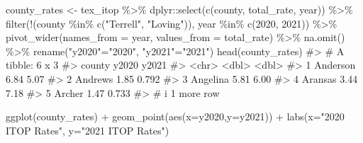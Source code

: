 \documentclass[
  letterpaper,
]{krantz}
\makeatletter
\newenvironment{Shaded}{\begin{snugshade}}{\end{snugshade}}
\newcommand{\AttributeTok}[1]{\textcolor[rgb]{0.40,0.45,0.13}{#1}}
\newcommand{\CommentTok}[1]{\textcolor[rgb]{0.37,0.37,0.37}{#1}}
\newcommand{\DecValTok}[1]{\textcolor[rgb]{0.68,0.00,0.00}{#1}}
\newcommand{\FunctionTok}[1]{\textcolor[rgb]{0.28,0.35,0.67}{#1}}
\newcommand{\NormalTok}[1]{\textcolor[rgb]{0.00,0.23,0.31}{#1}}
\newcommand{\OtherTok}[1]{\textcolor[rgb]{0.00,0.23,0.31}{#1}}
\newcommand{\SpecialCharTok}[1]{\textcolor[rgb]{0.37,0.37,0.37}{#1}}
\newcommand{\StringTok}[1]{\textcolor[rgb]{0.13,0.47,0.30}{#1}}
\newenvironment{kframe}{%
\medskip{}
\setlength{\fboxsep}{.8em}
 \def\at@end@of@kframe{}%
 \ifinner\ifhmode%
  \def\at@end@of@kframe{\end{minipage}}%
  \begin{minipage}{\columnwidth}%
 \fi\fi%
 \def\FrameCommand##1{\hskip\@totalleftmargin \hskip-\fboxsep
 \colorbox{shadecolor}{##1}\hskip-\fboxsep
     \hskip-\linewidth \hskip-\@totalleftmargin \hskip\columnwidth}%
 \MakeFramed {\advance\hsize-\width
   \@totalleftmargin\z@ \linewidth\hsize
   \@setminipage}}%
 {\par\unskip\endMakeFramed%
 \at@end@of@kframe}
\renewenvironment{Shaded}{\begin{kframe}}{\end{kframe}}
\makeatother
\begin{document}
\begin{Shaded}
\begin{Highlighting}[]
\NormalTok{county\_rates }\OtherTok{\textless{}{-}}\NormalTok{ tex\_itop }\SpecialCharTok{\%\textgreater{}\%}
\NormalTok{  dplyr}\SpecialCharTok{::}\FunctionTok{select}\NormalTok{(}\FunctionTok{c}\NormalTok{(county, total\_rate, year)) }\SpecialCharTok{\%\textgreater{}\%}
  \FunctionTok{filter}\NormalTok{(}\SpecialCharTok{!}\NormalTok{(county }\SpecialCharTok{\%in\%} \FunctionTok{c}\NormalTok{(}\StringTok{"Terrell"}\NormalTok{, }\StringTok{"Loving"}\NormalTok{)), }
\NormalTok{         year }\SpecialCharTok{\%in\%} \FunctionTok{c}\NormalTok{(}\DecValTok{2020}\NormalTok{, }\DecValTok{2021}\NormalTok{)) }\SpecialCharTok{\%\textgreater{}\%}
  \FunctionTok{pivot\_wider}\NormalTok{(}\AttributeTok{names\_from =}\NormalTok{ year, }\AttributeTok{values\_from =}\NormalTok{ total\_rate) }\SpecialCharTok{\%\textgreater{}\%}
  \FunctionTok{na.omit}\NormalTok{() }\SpecialCharTok{\%\textgreater{}\%}
  \FunctionTok{rename}\NormalTok{(}\StringTok{"y2020"}\OtherTok{=}\StringTok{"2020"}\NormalTok{, }\StringTok{"y2021"}\OtherTok{=}\StringTok{"2021"}\NormalTok{)}
\FunctionTok{head}\NormalTok{(county\_rates)}
\CommentTok{\#\textgreater{} \# A tibble: 6 x 3}
\CommentTok{\#\textgreater{}   county   y2020 y2021}
\CommentTok{\#\textgreater{}   \textless{}chr\textgreater{}    \textless{}dbl\textgreater{} \textless{}dbl\textgreater{}}
\CommentTok{\#\textgreater{} 1 Anderson  6.84 5.07 }
\CommentTok{\#\textgreater{} 2 Andrews   1.85 0.792}
\CommentTok{\#\textgreater{} 3 Angelina  5.81 6.00 }
\CommentTok{\#\textgreater{} 4 Aransas   3.44 7.18 }
\CommentTok{\#\textgreater{} 5 Archer    1.47 0.733}
\CommentTok{\#\textgreater{} \# i 1 more row}
\end{Highlighting}
\end{Shaded}

\begin{Shaded}
\begin{Highlighting}[]
\FunctionTok{ggplot}\NormalTok{(county\_rates) }\SpecialCharTok{+} 
 \FunctionTok{geom\_point}\NormalTok{(}\FunctionTok{aes}\NormalTok{(}\AttributeTok{x=}\NormalTok{y2020,}\AttributeTok{y=}\NormalTok{y2021)) }\SpecialCharTok{+}
 \FunctionTok{labs}\NormalTok{(}\AttributeTok{x=}\StringTok{"2020 ITOP Rates"}\NormalTok{, }\AttributeTok{y=}\StringTok{"2021 ITOP Rates"}\NormalTok{)}
\end{Highlighting}
\end{Shaded}
\end{document}
